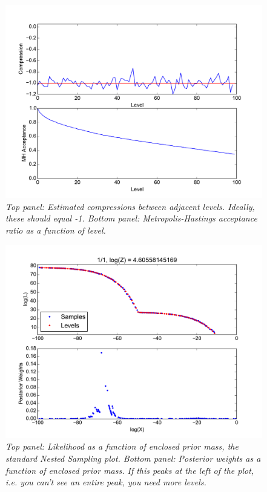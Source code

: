 \documentclass[a4paper, 11pt]{article}
\begin{document}
\begin{figure}
\begin{center}
\includegraphics[scale=0.5]{fig2.pdf}
\caption{\it Top panel: Estimated compressions between adjacent levels. Ideally, these should equal -1. Bottom panel: Metropolis-Hastings acceptance ratio
as a function of level.\label{fig:fig2}}
\end{center}
\end{figure}

\begin{figure}
\begin{center}
\includegraphics[scale=0.5]{fig3.pdf}
\caption{\it Top panel: Likelihood as a function of enclosed prior mass,
the standard Nested Sampling plot. Bottom panel: Posterior weights as a
function of enclosed prior mass. If this peaks at the left of the plot,
i.e. you can't see an entire peak, you need more levels.\label{fig:fig3}}
\end{center}
\end{figure}
\end{document}
